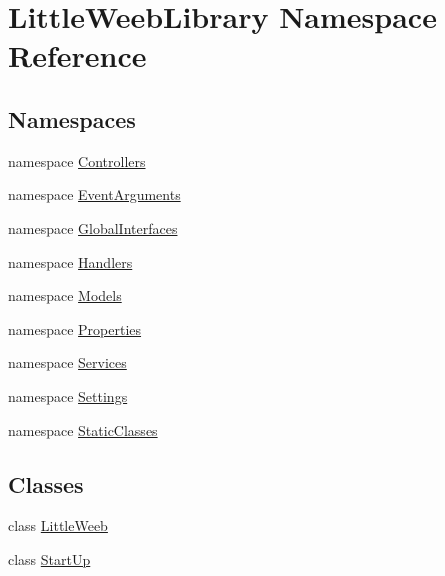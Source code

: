 \hypertarget{namespace_little_weeb_library}{}\section{Little\+Weeb\+Library Namespace Reference}
\label{namespace_little_weeb_library}
\subsection*{Namespaces}
\begin{DoxyCompactItemize}
\item 
namespace \mbox{\hyperlink{namespace_little_weeb_library_1_1_controllers}{Controllers}}
\item 
namespace \mbox{\hyperlink{namespace_little_weeb_library_1_1_event_arguments}{Event\+Arguments}}
\item 
namespace \mbox{\hyperlink{namespace_little_weeb_library_1_1_global_interfaces}{Global\+Interfaces}}
\item 
namespace \mbox{\hyperlink{namespace_little_weeb_library_1_1_handlers}{Handlers}}
\item 
namespace \mbox{\hyperlink{namespace_little_weeb_library_1_1_models}{Models}}
\item 
namespace \mbox{\hyperlink{namespace_little_weeb_library_1_1_properties}{Properties}}
\item 
namespace \mbox{\hyperlink{namespace_little_weeb_library_1_1_services}{Services}}
\item 
namespace \mbox{\hyperlink{namespace_little_weeb_library_1_1_settings}{Settings}}
\item 
namespace \mbox{\hyperlink{namespace_little_weeb_library_1_1_static_classes}{Static\+Classes}}
\end{DoxyCompactItemize}
\subsection*{Classes}
\begin{DoxyCompactItemize}
\item 
class \mbox{\hyperlink{class_little_weeb_library_1_1_little_weeb}{Little\+Weeb}}
\item 
class \mbox{\hyperlink{class_little_weeb_library_1_1_start_up}{Start\+Up}}
\end{DoxyCompactItemize}
